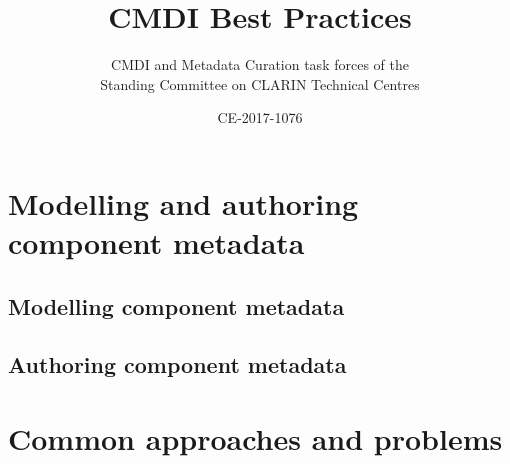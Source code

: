 \documentclass[twoside]{book}
\date{CE-2017-1076\\[1.5\baselineskip]\ifthenelse{\boolean{bpdraft}}{Version \bpversion{} DRAFT\\ \today}{Version \bpversion}}
\begin{document}
\title{CMDI Best Practices}

\author{CMDI and Metadata Curation task forces of the\\Standing Committee on CLARIN Technical Centres}

\frontmatter
\maketitle



\cleardoublepage
\tableofcontents

\cleardoublepage
\label{introduction}





\mainmatter


\chapter{Modelling and authoring component metadata}

\section{Modelling component metadata}\label{modelling-component-metadata}







\section{Authoring component metadata}\label{authoring-component-metadata-records}







\chapter{Common approaches and problems}\label{common-approaches-problems}









\raggedright %

\end{document}
